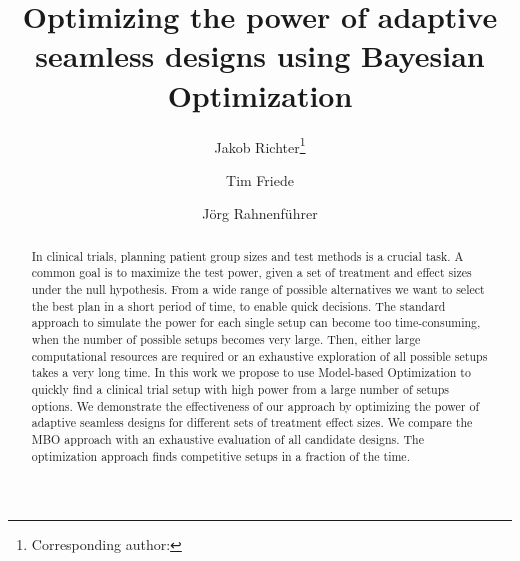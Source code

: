 \documentclass[bimj,fleqn]{w-art}
\theoremstyle{plain}
\theoremstyle{definition}
\begin{document}

\title[Model-based Optimization of Adaptive Seamless Designs]{Optimizing the power of adaptive seamless designs using Bayesian Optimization} %
\author[Jakob Richter {\it{et al.}}]{Jakob Richter\footnote{Corresponding author: {}}} 
\address[\inst{1}]{Fakultät Statistik, Technische Universität Dortmund, 44221 Dortmund}
\author[dd]{Tim Friede}
\address[\inst{2}]{Institut für Medizinische Statistik, Universitätsmedizin Göttingen, 37073 Göttingen}
\author[]{Jörg Rahnenführer} %
   

\begin{abstract}
In clinical trials, planning patient group sizes and test methods is a crucial task.
A common goal is to maximize the test power, given a set of treatment and effect sizes under the null hypothesis.
From a wide range of possible alternatives we want to select the best plan in a short period of time, to enable quick decisions.
The standard approach to simulate the power for each single setup can become too time-consuming, when the number of possible setups becomes very large.
Then, either large computational resources are required or an exhaustive exploration of all possible setups takes a very long time.
In this work we propose to use Model-based Optimization to quickly find a clinical trial setup with high power from a large number of setups options.
We demonstrate the effectiveness of our approach by optimizing the power of adaptive seamless designs for different sets of treatment effect sizes.
We compare the MBO approach with an exhaustive evaluation of all candidate designs.
The optimization approach finds competitive setups in a fraction of the time.
\end{abstract}
\end{document}

